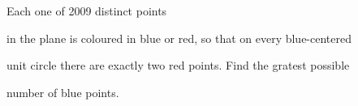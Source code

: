 Each one of 2009 distinct points 

in the plane is coloured in blue or red, so that on every blue-centered 

unit circle there are exactly two red points. Find the gratest possible 

number of blue points.